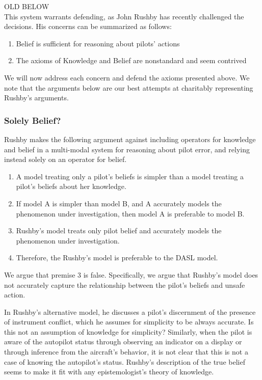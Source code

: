 OLD BELOW\\
This system warrants defending, as John Rushby has recently challenged the decisions. His concerns can be summarized as follows:
\begin{enumerate}
	\item Belief is sufficient for reasoning about pilots' actions
	\item The axioms of Knowledge and Belief are nonstandard and seem contrived
\end{enumerate}
We will now address each concern and defend the axioms presented above. We note that the arguments below are our best attempts at charitably representing Rushby's arguments.

\subsubsection*{Solely Belief?}
Rushby makes the following argument against including operators for knowledge and belief in a multi-modal system for reasoning about pilot error, and relying instead solely on an operator for belief.
\begin{enumerate}
	\item A model treating only a pilot's beliefs is simpler than a model treating a pilot's beliefs about her knowledge.
	\item If model A is simpler than model B, and A accurately models the phenomenon under investigation, then model A is preferable to model B.
	\item Rushby's model treats only pilot belief and accurately models the phenomenon under investigation.
	\item Therefore, the Rushby's model is preferable to the DASL model.
\end{enumerate}

We argue that premise 3 is false. Specifically, we argue that Rushby's model does not accurately capture the relationship between the pilot's beliefs and unsafe action.

In Rushby's alternative model, he discusses a pilot's discernment of the presence of instrument conflict, which he assumes for simplicity to be always accurate. Is this not an assumption of knowledge for simplicity? Similarly, when the pilot is aware of the autopilot status through observing an indicator on a display or through inference from the aircraft's behavior, it is not clear that this is not a case of knowing the autopilot's status. Rushby's description of the true belief seems to make it fit with any epistemologist's theory of knowledge. 

